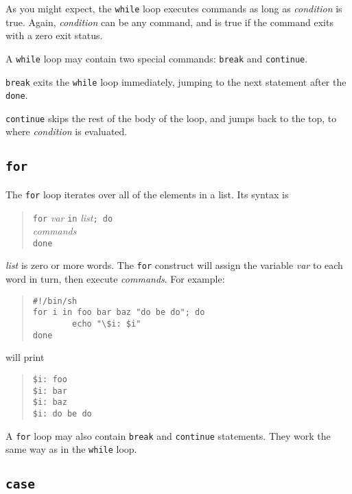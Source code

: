 \documentclass{article}
\newcommand{\code}[1]{\texttt{#1}}
\begin{document}
	As you might expect, the \code{while} loop executes commands
as long as \textit{condition} is true. Again, \textit{condition} can
be any command, and is true if the command exits with a zero exit
status.

	A \code{while} loop may contain two special commands:
\code{break} and \code{continue}.

	\code{break} exits the \code{while} loop immediately, jumping
to the next statement after the \code{done}.

	\code{continue} skips the rest of the body of the loop, and
jumps back to the top, to where \textit{condition} is evaluated.

\subsection{\code{for}}

	The \code{for} loop iterates over all of the elements in a
list. Its syntax is
\begin{quote}
\begin{tabbing}
\code{for} \= \textit{var} \code{in} \textit{list}\code{; do}\\
	\> \textit{commands}\\
\code{done}
\end{tabbing}
\end{quote}

	\textit{list} is zero or more words. The \code{for} construct
will assign the variable \textit{var} to each word in turn, then
execute \textit{commands}. For example:

\begin{quote}
\begin{verbatim}
#!/bin/sh
for i in foo bar baz "do be do"; do
        echo "\$i: $i"
done
\end{verbatim}%
\end{quote}
will print
\begin{quote}
\begin{verbatim}
$i: foo
$i: bar
$i: baz
$i: do be do
\end{verbatim}%
\end{quote}

	A \code{for} loop may also contain \code{break} and
\code{continue} statements. They work the same way as in the
\code{while} loop.

\subsection{\code{case}}
\end{document}
